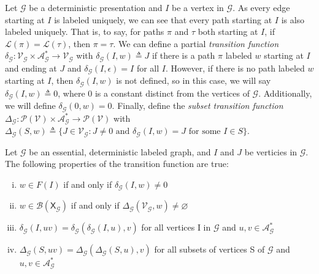 \documentclass[hidelinks]{report}
\newcommand{\Ac}{\mathcal{A}}  %
\newcommand{\Lc}{\mathcal{L}}  %
\newcommand{\Gc}{\mathcal{G}}  %
\newcommand{\Vc}{\mathcal{V}}
\newcommand{\Bc}{\mathcal{B}}
\newcommand{\shift}[1]{\mathsf{X}_{#1}}
\newcommand{\term}[1]{\textit{#1}}
\theoremstyle{definition}
\begin{document}
Let \(\Gc\) be a deterministic presentation and \(I\) be a vertex in \(\Gc\). 
As every edge starting at \(I\) is labeled uniquely, we can see 
that every path starting at \(I\) is also labeled uniquely. That is, to say, for paths 
\(\pi\) and \(\tau\) both starting at \(I\), if \(\Lc(\pi) = \Lc(\tau)\), then \(\pi = \tau\). We can 
define a partial \term{transition function} \(\delta_\Gc : \Vc_\Gc \times \Ac_\Gc^* \to \Vc_\Gc\) 
with \(\delta_\Gc(I, w) \triangleq J\) if there is a path \(\pi\) labeled \(w\) starting 
at \(I\) and ending at \(J\) and \(\delta_\Gc(I, \epsilon) = I\) for all \(I\). However, if there is no path labeled \(w\) starting at \(I\),
then \(\delta_\Gc(I, w)\) is not defined, so in this case, we will say \(\delta_\Gc(I, w) \triangleq 0\),
where \(0\) is a constant distinct from the vertices of \(\Gc\). Additionally, we 
will define \(\delta_\Gc(0, w) = 0\). Finally, define 
the \term{subset transition function} \(\Delta_\Gc : \mathcal{P}(\Vc) \times \Ac_\Gc^* \to \mathcal{P}(\Vc)\)
with \(\Delta_\Gc(S, w) \triangleq \{ J \in \Vc_\Gc : J \neq 0 \text{ and } \delta_\Gc(I, w) = J \text{ for some } I \in S\}\).

\begin{proposition}\label{deltaprops}
    Let \(\Gc\) be an essential, deterministic labeled graph, and \(I\) and \(J\) be verticies in \(\Gc\). The following properties of the 
    transition function are true:

    \begin{enumerate}[(i)]
        \item \(w \in F(I)\) if and only if \(\delta_\Gc(I, w) \neq 0\)
        \item \(w \in \Bc(\shift\Gc)\) if and only if \(\Delta_\Gc(\Vc_\Gc, w) \neq \varnothing\)
        \item \(\delta_\Gc(I, uv) = \delta_\Gc(\delta_\Gc(I, u), v)\) for all vertices I in \(\Gc\) and \(u, v \in \Ac_\Gc^*\)
        \item \(\Delta_\Gc(S, uv) = \Delta_\Gc(\Delta_\Gc(S, u), v)\) for all subsets of vertices S of \(\Gc\) and \(u, v \in \Ac_\Gc^*\)
    \end{enumerate}
\end{proposition}
\end{document}
